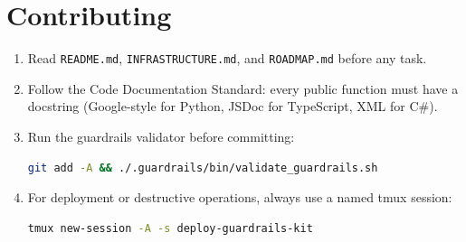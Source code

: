 \documentclass[11pt,a4paper]{article}
\begin{document}
\section{Contributing}
\begin{enumerate}
  \item Read \texttt{README.md}, \texttt{INFRASTRUCTURE.md}, and \texttt{ROADMAP.md} before any task.
  \item Follow the Code Documentation Standard: every public function must have
    a docstring (Google-style for Python, JSDoc for TypeScript, XML for C\#).
  \item Run the guardrails validator before committing:
    \begin{lstlisting}[language=bash]
git add -A && ./.guardrails/bin/validate_guardrails.sh
    \end{lstlisting}
  \item For deployment or destructive operations, always use a named tmux session:
    \begin{lstlisting}[language=bash]
tmux new-session -A -s deploy-guardrails-kit
    \end{lstlisting}
\end{enumerate}
\end{document}
